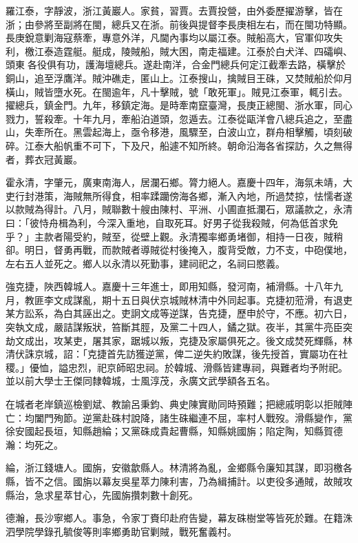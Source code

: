 \begin{pinyinscope}
羅江泰，字靜波，浙江黃巖人。家貧，習賈。去賈投營，由外委歷擢游擊，皆在浙；由參將至副將在閩，總兵又在浙。前後與提督李長庚相左右，而在閩功特顯。長庚銳意剿海寇蔡牽，專意外洋，凡閫內事均以屬江泰。賊船高大，官軍仰攻失利，檄江泰造霆艇。艇成，陵賊船，賊大困，南走福建。江泰於白犬洋、四礵嶼、頭東各役俱有功，護海壇總兵。遂赴南洋，合金門總兵何定江截牽去路，橫擊於銅山，追至浮鷹洋。賊沖礁走，匿山上。江泰搜山，擒賊目王硃，又焚賊船於仰月橫山，賊皆墮水死。在閩逾年，凡十擊賊，號「敢死軍」。賊見江泰軍，輒引去。擢總兵，鎮金門。九年，移鎮定海。是時牽南竄臺灣，長庚正總閩、浙水軍，同心戮力，誓殺牽。十年九月，牽船泊道頭，忽遁去。江泰從甌洋會八總兵追之，至盡山，失牽所在。黑雲起海上，亟令移港，風驟至，白波山立，群舟相擊觸，頃刻破碎。江泰大船帆重不可下，下及尺，船遽不知所終。朝命沿海各省探訪，久之無得者，葬衣冠黃巖。

霍永清，字肇元，廣東南海人，居瀾石鄉。膂力絕人。嘉慶十四年，海氛未靖，大吏行封港策，海賊無所得食，相率蹂躪傍海各鄉，漸入內地，所過焚掠，怯懦者遂以款賊為得計。八月，賊聯數十艘由陳村、平洲、小圃直抵瀾石，眾議款之，永清曰：「彼恃舟楫為利，今深入重地，自取死耳。好男子從我殺賊，何為低首求免乎？」主款者陽受約，賊至，從壁上觀。永清獨率鄉勇堵御，相持一日夜，賊稍卻。明日，督勇再戰，而款賊者導賊從村後掩入，腹背受敵，力不支，中砲僕地，左右五人並死之。鄉人以永清以死勤事，建祠祀之，名祠曰愍義。

強克捷，陜西韓城人。嘉慶十三年進士，即用知縣，發河南，補滑縣。十八年九月，教匪李文成謀亂，期十五日與伏京城賊林清中外同起事。克捷初蒞滑，有退吏某方訟系，為白其誣出之。吏詗文成等逆謀，告克捷，歷申於守，不應。初六日，突執文成，嚴詰謀叛狀，笞斷其脛，及黨二十四人，鐍之獄。夜半，其黨牛亮臣突劫文成出，攻某吏，屠其家，踞城以叛，克捷及家屬俱死之。後文成焚死輝縣，林清伏誅京城，詔：「克捷首先訪獲逆黨，俾二逆失約敗謀，後先授首，實屬功在社稷。」優恤，謚忠烈，祀京師昭忠祠。於韓城、滑縣皆建專祠，與難者均予附祀。並以前大學士王傑同隸韓城，士風淳茂，永廣文武學額各五名。

在城者老岸鎮巡檢劉斌、教諭呂秉鈞、典史陳實勛同時預難；把總戚明彰以拒賊陣亡：均闔門殉節。逆黨赴硃村說降，諸生硃繼連不屈，率村人戰歿。滑縣變作，黨徐安國起長垣，知縣趙綸；又黨硃成貴起曹縣，知縣姚國旃；陷定陶，知縣賀德瀚：均死之。

綸，浙江錢塘人。國旃，安徽歙縣人。林清將為亂，金鄉縣令廉知其謀，即羽檄各縣，皆不之信。國旃以幕友吳星萃力陳利害，乃為緝捕計。以吏役多通賊，故賊攻縣治，急求星萃甘心，先國旃攢刺數十創死。

德瀚，長沙寧鄉人。事急，令家丁賚印赴府告變，幕友硃樹堂等皆死於難。在籍洙泗學院學錄孔毓俊等則率鄉勇助官剿賊，戰死奮義村。


\end{pinyinscope}
